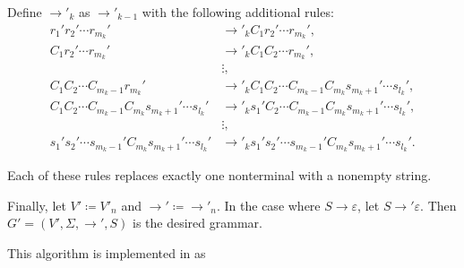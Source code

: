 \begin{algorithm}
\begin{thmenum}
    Define \( \to'_k \) as \( \to'_{k-1} \) with the following additional rules:
    \begin{align*}
      r_1' r_2' \cdots r_{m_k}'                                      &\to'_k C_1 r_2' \cdots r_{m_k}', \\
      C_1 r_2' \cdots r_{m_k}'                                       &\to'_k C_1 C_2 \cdots r_{m_k}', \\
                                                                     &\vdots, \\
      C_1 C_2 \cdots C_{m_k-1} r_{m_k}'                              &\to'_k C_1 C_2 \cdots C_{m_k-1} C_{m_k} s_{m_k+1}' \cdots s_{l_k}', \\
      C_1 C_2 \cdots C_{m_k-1} C_{m_k} s_{m_k+1}' \cdots s_{l_k}'    &\to'_k s_1' C_2 \cdots C_{m_k-1} C_{m_k} s_{m_k+1}' \cdots s_{l_k}', \\
                                                                     &\vdots, \\
      s_1' s_2' \cdots s_{m_k-1}' C_{m_k} s_{m_k+1}' \cdots s_{l_k}' &\to'_k s_1' s_2' \cdots s_{m_k-1}' C_{m_k} s_{m_k+1}' \cdots s_{l_k}'.
    \end{align*}

    Each of these rules replaces exactly one nonterminal with a nonempty string.

     Finally, let \( V' \coloneqq V'_n \) and \( {\to'} \coloneqq {\to'_n} \). In the case where \( S \to \varepsilon \), let \( S \to' \varepsilon \). Then \( G' = (V', \Sigma, \to', S) \) is the desired grammar.
  \end{thmenum}
\end{algorithm}
\begin{comments}
  \item This algorithm is implemented in \cite{notebook:code} as
  \begin{CodeRefDisplay}
  \end{CodeRefDisplay}
\end{comments}

